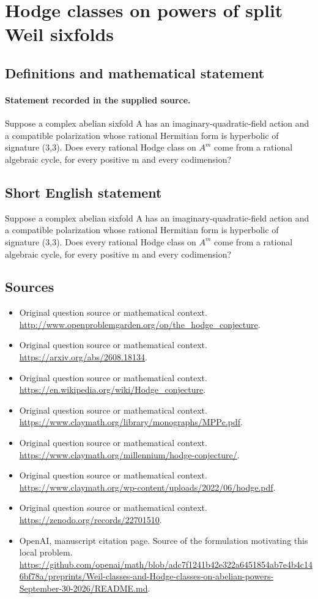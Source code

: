 \documentclass[11pt]{article}
\begin{document}
\section*{Hodge classes on powers of split Weil sixfolds}\label{30007036}
\subsection{Definitions and mathematical statement}
\paragraph{Statement recorded in the supplied source.}
Suppose a complex abelian sixfold A has an imaginary-quadratic-field action and a compatible polarization whose rational Hermitian form is hyperbolic of signature (3,3). Does every rational Hodge class on $A^m$ come from a rational algebraic cycle, for every positive m and every codimension?
\subsection{Short English statement}
Suppose a complex abelian sixfold A has an imaginary-quadratic-field action and a compatible polarization whose rational Hermitian form is hyperbolic of signature (3,3). Does every rational Hodge class on $A^m$ come from a rational algebraic cycle, for every positive m and every codimension?
\subsection{Sources}
\begin{itemize}
\item[S1] Original question source or mathematical context.
\url{http://www.openproblemgarden.org/op/the_hodge_conjecture}.
\item[S2] Original question source or mathematical context.
\url{https://arxiv.org/abs/2608.18134}.
\item[S3] Original question source or mathematical context.
\url{https://en.wikipedia.org/wiki/Hodge_conjecture}.
\item[S4] Original question source or mathematical context.
\url{https://www.claymath.org/library/monographs/MPPc.pdf}.
\item[S5] Original question source or mathematical context.
\url{https://www.claymath.org/millennium/hodge-conjecture/}.
\item[S6] Original question source or mathematical context.
\url{https://www.claymath.org/wp-content/uploads/2022/06/hodge.pdf}.
\item[S7] Original question source or mathematical context.
\url{https://zenodo.org/records/22701510}.
\item[S8] OpenAI, manuscript citation page. Source of the formulation motivating this local problem.
\url{https://github.com/openai/math/blob/adc7f1241b42e322a6451854ab7e4b4c146bf78a/preprints/Weil-classes-and-Hodge-classes-on-abelian-powers-September-30-2026/README.md}.
\end{itemize}
\end{document}
